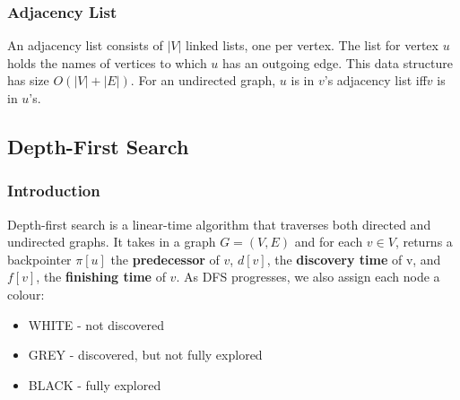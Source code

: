 \documentclass{article}
\begin{document}
        \subsubsection{Adjacency List}
            An adjacency list consists of $|V|$ linked lists, one per vertex. The list for vertex $u$ holds the names of vertices to which $u$ has an outgoing edge. This data structure has size $O(|V| + |E|)$. For an undirected graph, $u$ is in $v$’s adjacency list iff$v$ is in $u$’s.
    \subsection{Depth-First Search}
        \subsubsection{Introduction}
            Depth-first search is a linear-time algorithm that traverses both directed and undirected graphs. It takes in a graph $G = (V,E)$ and for each $v \in V$, returns a backpointer $\pi [u]$ the \textbf{predecessor} of $v$, $d[v]$, the \textbf{discovery time} of v, and $f[v]$, the \textbf{finishing time} of $v$. As DFS progresses, we also assign each node a colour:
            \begin{itemize}
                \item WHITE - not discovered
                \item GREY - discovered, but not fully explored
                \item BLACK - fully explored
            \end{itemize}
\end{document}
